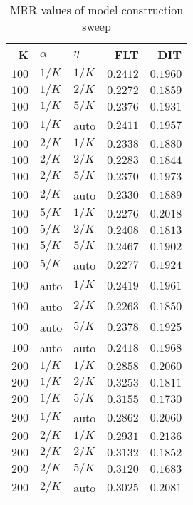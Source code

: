 
\begin{table}
\begin{spacing}{1.2}
\centering
\caption{MRR values of \pig model construction sweep}
\label{table:pig_model_sweep}
\vspace{0.2em}
\parbox{.45\linewidth}{\centering \begin{tabular}{rll|rr}
\toprule
    K &  $\alpha$ &    $\eta$ &      FLT &      DIT \\
\midrule
$100$ &  $1/K$ &  $1/K$ & $0.2412$ & $0.1960$ \\
$100$ &  $1/K$ &  $2/K$ & $0.2272$ & $0.1859$ \\
$100$ &  $1/K$ &  $5/K$ & $0.2376$ & $0.1931$ \\
$100$ &  $1/K$ &   auto & $0.2411$ & $0.1957$ \\
$100$ &  $2/K$ &  $1/K$ & $0.2338$ & $0.1880$ \\
$100$ &  $2/K$ &  $2/K$ & $0.2283$ & $0.1844$ \\
$100$ &  $2/K$ &  $5/K$ & $0.2370$ & $0.1973$ \\
$100$ &  $2/K$ &   auto & $0.2330$ & $0.1889$ \\
$100$ &  $5/K$ &  $1/K$ & $0.2276$ & $0.2018$ \\
$100$ &  $5/K$ &  $2/K$ & $0.2408$ & $0.1813$ \\
$100$ &  $5/K$ &  $5/K$ & $0.2467$ & $0.1902$ \\
$100$ &  $5/K$ &   auto & $0.2277$ & $0.1924$ \\
$100$ &   auto &  $1/K$ & $0.2419$ & $0.1961$ \\
$100$ &   auto &  $2/K$ & $0.2263$ & $0.1850$ \\
$100$ &   auto &  $5/K$ & $0.2378$ & $0.1925$ \\
$100$ &   auto &   auto & $0.2418$ & $0.1968$ \\
$200$ &  $1/K$ &  $1/K$ & $0.2858$ & $0.2060$ \\
$200$ &  $1/K$ &  $2/K$ & $0.3253$ & $0.1811$ \\
$200$ &  $1/K$ &  $5/K$ & $0.3155$ & $0.1730$ \\
$200$ &  $1/K$ &   auto & $0.2862$ & $0.2060$ \\
$200$ &  $2/K$ &  $1/K$ & $0.2931$ & $0.2136$ \\
$200$ &  $2/K$ &  $2/K$ & $0.3132$ & $0.1852$ \\
$200$ &  $2/K$ &  $5/K$ & $0.3120$ & $0.1683$ \\
$200$ &  $2/K$ &   auto & $0.3025$ & $0.2081$ \\

\end{tabular}}
\end{spacing}
\end{table}
